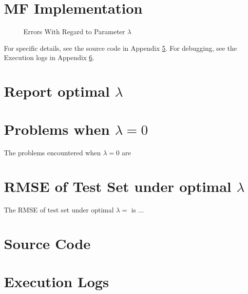 \documentclass[11pt,a4paper]{article}
\begin{document}
\begin{titlepage}
    \maketitle
\end{titlepage}
\renewcommand{\contentsname}{Contents}
\begin{center} 
    \tableofcontents 
    \listoffigures
\end{center}
\newpage

\section{MF Implementation}

\begin{figure}[h]
    \centering
    \caption{Errors With Regard to Parameter $\lambda$}
\end{figure}
For specific details, see the source code in Appendix \ref{AppdendixA}.
For debugging, see the Execution logs in Appendix \ref{AppdendixB}.

\section{Report optimal $\lambda$}

\section{Problems when $\lambda = 0$}
The problems encountered when $\lambda = 0$ are 

\section{RMSE of Test Set under optimal $\lambda$}
The RMSE of test set under optimal $\lambda = $ is $..$.

\newpage
\appendix
\section{Source Code}
\label{AppdendixA}

\section{Execution Logs}
\label{AppdendixB}


\end{document}
